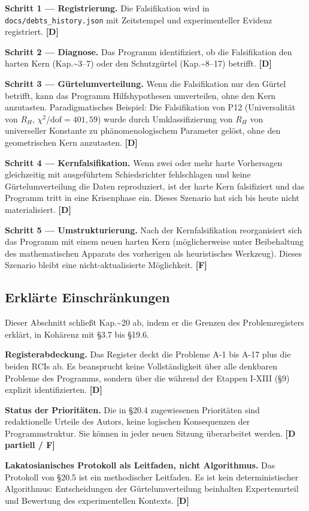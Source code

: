 ﻿\documentclass[11pt,letterpaper]{article}
\begin{document}
\textbf{Schritt 1 --- Registrierung.} Die Falsifikation wird in \texttt{docs/debts\_history.json} mit Zeitstempel und experimenteller Evidenz registriert. \textbf{[D]}

\textbf{Schritt 2 --- Diagnose.} Das Programm identifiziert, ob die Falsifikation den harten Kern (Kap.\textasciitilde{}3--7) oder den Schutzgürtel (Kap.\textasciitilde{}8--17) betrifft. \textbf{[D]}

\textbf{Schritt 3 --- Gürtelumverteilung.} Wenn die Falsifikation nur den Gürtel betrifft, kann das Programm Hilfshypothesen umverteilen, ohne den Kern anzutasten. Paradigmatisches Beispiel: Die Falsifikation von P12 (Universalität von $R_H$, $\chi^2/\text{dof} = 401{,}59$) wurde durch Umklassifizierung von $R_H$ von universeller Konstante zu phänomenologischem Parameter gelöst, ohne den geometrischen Kern anzutasten. \textbf{[D]}

\textbf{Schritt 4 --- Kernfalsifikation.} Wenn zwei oder mehr harte Vorhersagen gleichzeitig mit ausgeführtem Schiedsrichter fehlschlagen und keine Gürtelumverteilung die Daten reproduziert, ist der harte Kern falsifiziert und das Programm tritt in eine Krisenphase ein. Dieses Szenario hat sich bis heute nicht materialisiert. \textbf{[D]}

\textbf{Schritt 5 --- Umstrukturierung.} Nach der Kernfalsifikation reorganisiert sich das Programm mit einem neuen harten Kern (möglicherweise unter Beibehaltung des mathematischen Apparats des vorherigen als heuristisches Werkzeug). Dieses Szenario bleibt eine nicht-aktualisierte Möglichkeit. \textbf{[F]}
\subsection{Erklärte Einschränkungen}
Dieser Abschnitt schließt Kap.\textasciitilde{}20 ab, indem er die Grenzen des Problemregisters erklärt, in Kohärenz mit §3.7 bis §19.6.

\textbf{Registerabdeckung.} Das Register deckt die Probleme A-1 bis A-17 plus die beiden RCIs ab. Es beansprucht keine Vollständigkeit über alle denkbaren Probleme des Programms, sondern über die während der Etappen I-XIII (§9) explizit identifizierten. \textbf{[D]}

\textbf{Status der Prioritäten.} Die in §20.4 zugewiesenen Prioritäten sind redaktionelle Urteile des Autors, keine logischen Konsequenzen der Programmstruktur. Sie können in jeder neuen Sitzung überarbeitet werden. \textbf{[D partiell / F]}

\textbf{Lakatosianisches Protokoll als Leitfaden, nicht Algorithmus.} Das Protokoll von §20.5 ist ein methodischer Leitfaden. Es ist kein deterministischer Algorithmus: Entscheidungen der Gürtelumverteilung beinhalten Expertenurteil und Bewertung des experimentellen Kontexts. \textbf{[D]}
\end{document}
